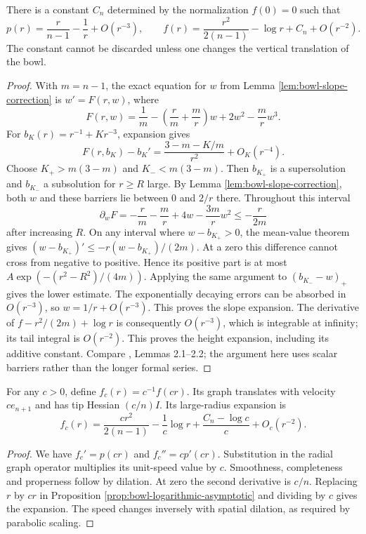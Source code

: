\begin{proposition}\label{prop:bowl-logarithmic-asymptotic}
There is a constant $C_n$ determined by the normalization $f(0)=0$ such that
\[
 p(r)=\frac r{n-1}-\frac1r+O(r^{-3}),\qquad
 f(r)=\frac{r^2}{2(n-1)}-\log r+C_n+O(r^{-2}).
\]
The constant cannot be discarded unless one changes the vertical translation of the bowl.
\end{proposition}
\begin{proof}
With $m=n-1$, the exact equation for $w$ from Lemma \ref{lem:bowl-slope-correction} is $w'=F(r,w)$, where
\[
 F(r,w)=\frac1m-\left(\frac r m+\frac m r\right)w+2w^2-\frac m r w^3.
\]
For $b_K(r)=r^{-1}+Kr^{-3}$, expansion gives
\[
 F(r,b_K)-b_K'
 =\frac{3-m-K/m}{r^2}+O_K(r^{-4}).
\]
Choose $K_+>m(3-m)$ and $K_-<m(3-m)$. Then $b_{K_+}$ is a supersolution and $b_{K_-}$ a subsolution for $r\geq R$ large. By Lemma \ref{lem:bowl-slope-correction}, both $w$ and these barriers lie between $0$ and $2/r$ there. Throughout this interval
\[
 \partial_wF=-\frac r m-\frac m r+4w-\frac{3m}r w^2
 \leq-\frac r{2m}
\]
after increasing $R$. On any interval where $w-b_{K_+}>0$, the mean-value theorem gives $(w-b_{K_+})'\leq-r(w-b_{K_+})/(2m)$. At a zero this difference cannot cross from negative to positive. Hence its positive part is at most $A\exp(-(r^2-R^2)/(4m))$. Applying the same argument to $(b_{K_-}-w)_+$ gives the lower estimate. The exponentially decaying errors can be absorbed in $O(r^{-3})$, so $w=1/r+O(r^{-3})$. This proves the slope expansion. The derivative of $f-r^2/(2m)+\log r$ is consequently $O(r^{-3})$, which is integrable at infinity; its tail integral is $O(r^{-2})$. This proves the height expansion, including its additive constant. Compare \cite{CSS07}, Lemmas 2.1--2.2; the argument here uses scalar barriers rather than the longer formal series.
\end{proof}

\begin{corollary}\label{cor:bowl-speed-scaling}
For any $c>0$, define $f_c(r)=c^{-1}f(cr)$. Its graph translates with velocity $ce_{n+1}$ and has tip Hessian $(c/n)I$. Its large-radius expansion is
\[
 f_c(r)=\frac{cr^2}{2(n-1)}-\frac1c\log r
 +\frac{C_n-\log c}{c}+O_c(r^{-2}).
\]
\end{corollary}
\begin{proof}
We have $f_c'=p(cr)$ and $f_c''=c p'(cr)$. Substitution in the radial graph operator multiplies its unit-speed value by $c$. Smoothness, completeness and properness follow by dilation. At zero the second derivative is $c/n$. Replacing $r$ by $cr$ in Proposition \ref{prop:bowl-logarithmic-asymptotic} and dividing by $c$ gives the expansion. The speed changes inversely with spatial dilation, as required by parabolic scaling.
\end{proof}
